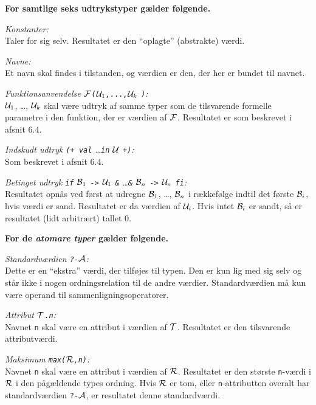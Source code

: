 {\bf For samtlige seks udtrykstyper g\ae{}lder f\o{}lgende.}

{\em Konstanter:}\\
Taler for sig selv. Resultatet er den ``oplagte'' (abstrakte) v\ae{}rdi.

{\em Navne:}\\
Et navn skal findes i tilstanden, og v\ae{}rdien er den,
der her er bundet til navnet.

{\em Funktionsanvendelse $\cal F$\verb"("${\cal U}_1$\verb",...,"${\cal U}_k$
\verb")":}\\
${\cal U}_1$, \ldots, ${\cal U}_k$ skal v\ae{}re udtryk af samme typer
som de tilsvarende formelle parametre i den funktion, der er
v\ae{}rdien af $\cal F$. Resultatet er som beskrev\-et i afsnit 6.4.

{\em Indskudt udtryk \verb"(+ val" \ldots \verb"in" $\cal U$ \verb"+)":}\\
Som beskrevet i afsnit 6.4.

{\em Betinget udtryk \verb"if" ${\cal B}_1$ \verb"->" ${\cal U}_1$
\verb"&" \ldots \verb"&" ${\cal B}_n$ \verb"->" ${\cal U}_n$ \verb"fi":}\\
Resultatet opn\aa{}s ved f\o{}rst at udregne ${\cal B}_1$, \ldots,
${\cal B}_n$ i r\ae{}kkef\o{}lge indtil det f\o{}rste ${\cal B}_i$,
hvis v\ae{}rdi er sand. Resultatet er da v\ae{}rdien af
${\cal U}_i$. Hvis intet ${\cal B}_i$ er sandt, s\aa{} er resultatet
(lidt arbitr\ae{}rt) tallet 0.

{\bf For de {\em atomare typer\/} g\ae{}lder f\o{}lgende.}

{\em Standardv\ae{}rdien \verb"?-"$\cal A$:}\\
Dette er en ``ekstra'' v\ae{}rdi, der tilf\o{}jes til typen.
Den er kun lig med sig selv og st\aa{}r ikke i nogen ordningsrelation
til de andre v\ae{}rdier. Standardv\ae{}rdien m\aa{} kun v\ae{}re
operand til sammenligningsoperatorer.

{\em Attribut $\cal T$\verb".n":}\\
Navnet \verb"n" skal v\ae{}re en attribut i v\ae{}rdien af $\cal T$.
Resultatet er den til\-svar\-en\-de attributv\ae{}rdi.

{\em Maksimum \verb"max("$\cal R$\verb",n)":}\\
Navnet \verb"n" skal v\ae{}re en attribut i v\ae{}rdien af $\cal R$.
Resultatet er den st\o{}rste \verb"n"-v\ae{}rdi i $\cal R$ i den
p\aa{}g\ae{}ldende types ordning. Hvis $\cal R$ er tom, eller
\verb"n"-attributten overalt har standardv\ae{}rdien \verb"?-"$\cal A$,
er resultatet denne standardv\ae{}rdi.

